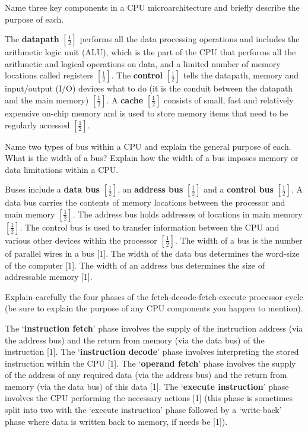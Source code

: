 \documentclass{exam}
\begin{document}
\begin{questions}
\begin{solution}[2in]
\end{solution}
\question[3]Name three key components in a CPU microarchitecture and briefly
describe the purpose of each.
\begin{solution}[2in]
The \textbf{datapath} $[\frac{1}{2}]$ performs all the data processing operations and includes
the arithmetic logic unit (ALU), which is the part of the CPU
that performs all the arithmetic and logical operations on data, and a
limited number of memory locations called registers $[\frac{1}{2}]$. The \textbf{control}
$[\frac{1}{2}]$ tells the datapath, memory and input/output (I/O) devices what
to do (it is the conduit between the datapath and the main memory) $[\frac{1}{2}]$. A \textbf{cache} $[\frac{1}{2}]$ consists of small, fast and relatively expensive on-chip
memory and is used to store memory items that need to be regularly
accessed $[\frac{1}{2}]$.
\end{solution}
\newpage
\question[6]Name two types of bus within a CPU and explain the general purpose
of each. What is the width of a bus? Explain how the width of a bus
imposes memory or data limitations within a CPU.
\begin{solution}[2in]
	Buses include a \textbf{data bus} $[\frac{1}{2}]$, an \textbf{address bus} $[\frac{1}{2}]$ and a \textbf{control bus} $[\frac{1}{2}]$. A data bus carries the contents of memory locations between the
	processor and main memory $[\frac{1}{2}]$. The address bus holds addresses of
	locations in main memory $[\frac{1}{2}]$. The control bus is used to transfer
	information between the CPU and various other devices within the
	processor $[\frac{1}{2}]$. The width of a bus is the number of parallel wires in
	a bus [1]. The width of the data bus determines the word-size of the
	computer [1]. The width of an address bus determines the size of
	addressable memory [1].
\end{solution}

\question[5]Explain carefully the four phases of the fetch-decode-fetch-execute processor cycle (be sure to explain the purpose of any CPU components
you happen to mention).
\begin{solution}[2in]
The ‘\textbf{instruction fetch}’ phase involves the supply of the instruction address
(via the address bus) and the return from memory (via the data
bus) of the instruction [1]. The ‘\textbf{instruction decode}’ phase involves
interpreting the stored instruction within the CPU [1]. The ‘\textbf{operand
	fetch}’ phase involves the supply of the address of any required data (via
the address bus) and the return from memory (via the data bus) of this
data [1]. The ‘\textbf{execute instruction}’ phase involves the CPU performing
the necessary actions [1] (this phase is sometimes split into two with
the ‘execute instruction’ phase followed by a ‘write-back’ phase where
data is written back to memory, if needs be [1]).
\end{solution}


\end{questions}
\end{document}
